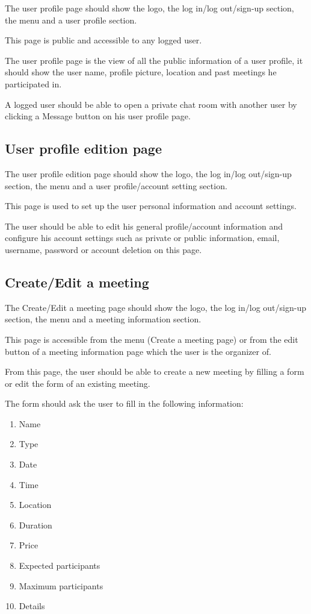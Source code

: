 \documentclass[conference]{IEEEtran}
\begin{document}
The user profile page should show the logo, the log in/log out/sign-up section, the menu and a user profile section.

This page is public and accessible to any logged user.

The user profile page is the view of all the public information of a user profile, it should show the user name, profile picture, location and past meetings he participated in.

A logged user should be able to open a private chat room with another user by clicking a Message button on his user profile page.

\subsection{User profile edition page}

The user profile edition page should show the logo, the log in/log out/sign-up section, the menu and a user profile/account setting section.

This page is used to set up the user personal information and account settings. 

The user should be able to edit his general profile/account information and configure his account settings such as private or public information, email, username, password or account deletion on this page.

\subsection{Create/Edit a meeting}

The Create/Edit a meeting page should show the logo, the log in/log out/sign-up section, the menu and a meeting information section.

This page is accessible from the menu (Create a meeting page) or from the edit button of a meeting information page which the user is the organizer of.

From this page, the user should be able to create a new meeting by filling a form or edit the form of an existing meeting.

The form should ask the user to fill in the following information:

\begin{enumerate}
    \item Name
    \item Type
    \item Date
    \item Time
    \item Location
    \item Duration
    \item Price
    \item Expected participants
    \item Maximum participants
    \item Details
\end{enumerate}
\end{document}
